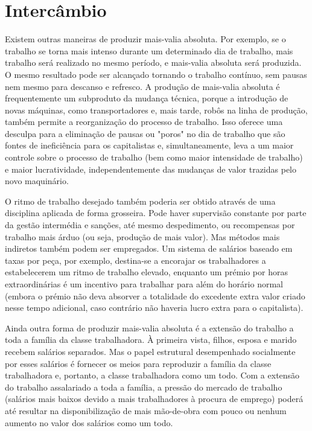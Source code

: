 \section{Intercâmbio}
 \par 
Existem outras maneiras de produzir mais-valia absoluta. Por exemplo, se o trabalho se torna mais intenso durante um determinado dia de trabalho, mais trabalho será realizado no mesmo período, e mais-valia absoluta será produzida. O mesmo resultado pode ser alcançado tornando o trabalho contínuo, sem pausas nem mesmo para descanso e refresco. A produção de mais-valia absoluta é frequentemente um subproduto da mudança técnica, porque a introdução de novas máquinas, como transportadores e, mais tarde, robôs na linha de produção, também permite a reorganização do processo de trabalho. Isso oferece uma desculpa para a eliminação de pausas ou "poros" no dia de trabalho que são fontes de ineficiência para os capitalistas e, simultaneamente, leva a um maior controle sobre o processo de trabalho (bem como maior intensidade de trabalho) e maior lucratividade, independentemente das mudanças de valor trazidas pelo novo maquinário.
 \par 
O ritmo de trabalho desejado também poderia ser obtido através de uma disciplina aplicada de forma grosseira. Pode haver supervisão constante por parte da gestão intermédia e sanções, até mesmo despedimento, ou recompensas por trabalho mais árduo (ou seja, produção de mais valor). Mas métodos mais indiretos também podem ser empregados. Um sistema de salários baseado em taxas por peça, por exemplo, destina-se a encorajar os trabalhadores a estabelecerem um ritmo de trabalho elevado, enquanto um prémio por horas extraordinárias é um incentivo para trabalhar para além do horário normal (embora o prémio não deva absorver a totalidade do excedente extra valor criado nesse tempo adicional, caso contrário não haveria lucro extra para o capitalista).
 \par 
Ainda outra forma de produzir mais-valia absoluta é a extensão do trabalho a toda a família da classe trabalhadora. À primeira vista, filhos, esposa e marido recebem salários separados. Mas o papel estrutural desempenhado socialmente por esses salários é fornecer os meios para reproduzir a família da classe trabalhadora e, portanto, a classe trabalhadora como um todo. Com a extensão do trabalho assalariado a toda a família, a pressão do mercado de trabalho (salários mais baixos devido a mais trabalhadores à procura de emprego) poderá até resultar na disponibilização de mais mão-de-obra com pouco ou nenhum aumento no valor dos salários como um todo.
